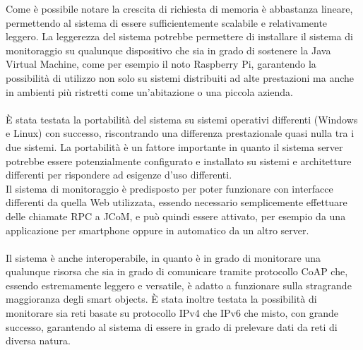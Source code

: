 \vspace{1.0cm}
Come è possibile notare la crescita di richiesta di memoria è abbastanza lineare, permettendo al sistema di essere sufficientemente scalabile e relativamente leggero. La leggerezza del sistema potrebbe permettere di installare il sistema di monitoraggio su qualunque dispositivo che sia in grado di sostenere la Java Virtual Machine, come per esempio il noto Raspberry Pi, garantendo la possibilità di utilizzo non solo su sistemi distribuiti ad alte prestazioni ma anche in ambienti più ristretti come un'abitazione o una piccola azienda.
\\\\È stata testata la portabilità del sistema su sistemi operativi differenti (Windows e Linux) con successo, riscontrando una differenza prestazionale quasi nulla tra i due sistemi. La portabilità è un fattore importante in quanto il sistema server potrebbe essere potenzialmente configurato e installato su sistemi e architetture differenti per rispondere ad esigenze d'uso differenti.
\\Il sistema di monitoraggio è predisposto per poter funzionare con interfacce differenti da quella Web utilizzata, essendo necessario semplicemente effettuare delle chiamate RPC a JCoM, e può quindi essere attivato, per esempio da una applicazione per smartphone oppure in automatico da un altro server.
\\\\Il sistema è anche interoperabile, in quanto è in grado di monitorare una qualunque risorsa che sia in grado di comunicare tramite protocollo CoAP che, essendo estremamente leggero e versatile, è adatto a funzionare sulla stragrande maggioranza degli smart objects. È stata inoltre testata la possibilità di monitorare sia reti basate su protocollo IPv4 che IPv6 che misto, con grande successo, garantendo al sistema di essere in grado di prelevare dati da reti di diversa natura.

